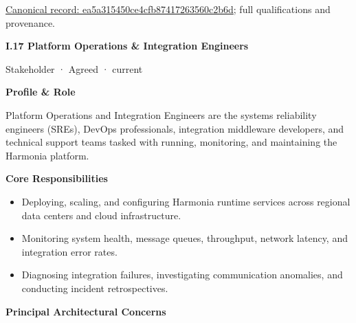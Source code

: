 {\footnotesize \href{../../../../continuum/motivation/stakeholder/ea5a315450ce4cfb87417263560c2b6d.md}{Canonical record: ea5a315450ce4cfb87417263560c2b6d}; full qualifications and provenance.}\par
\par\medskip{}\label{navigation:I.17}
\textbf{I.17 Platform Operations \& Integration Engineers}\par

\label{element:c20aa17ce4aa4a58be5eb3cff2ecdd1d}
{\small Stakeholder · Agreed · current}\par

\par\medskip\textbf{Profile \& Role}\par


Platform Operations and Integration Engineers are the systems reliability engineers (SREs), DevOps professionals, integration middleware developers, and technical support teams tasked with running, monitoring, and maintaining the Harmonia platform.



\par\medskip\textbf{Core Responsibilities}\par


\begin{itemize}


\item Deploying, scaling, and configuring Harmonia runtime services across regional data centers and cloud infrastructure.

\item Monitoring system health, message queues, throughput, network latency, and integration error rates.

\item Diagnosing integration failures, investigating communication anomalies, and conducting incident retrospectives.

\end{itemize}


\par\medskip\textbf{Principal Architectural Concerns}\par


